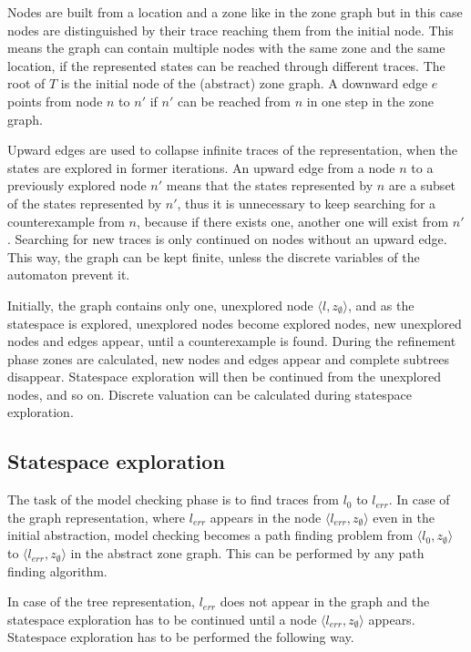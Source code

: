 Nodes are built from a location and a zone like in the zone graph but in this case nodes are distinguished by their trace reaching them from the initial node. This means the graph can contain multiple nodes with the same zone and the same location, if the represented states can be reached through different traces. The root of $T$ is the initial node of the (abstract) zone graph. A downward edge $e$ points from node $n$ to $n'$ if $n'$ can be reached from $n$ in one step in the zone graph. %

Upward edges are used to collapse infinite traces of the representation, when the states are explored in former iterations. An upward edge from a node $n$ to a previously explored node $n'$ means that the states
represented by $n$ are a subset of the states represented by $n'$, thus it is unnecessary to keep searching for a
counterexample from $n$, because if there exists one, another one will exist
from $n'$. Searching for new traces is only continued on nodes without an upward edge. This way, the graph can be kept finite, unless the discrete variables of the automaton prevent it.

Initially, the graph contains only one, unexplored node $\langle l, z_{\emptyset} \rangle$, and as the statespace is explored, unexplored nodes become explored nodes, new unexplored nodes and edges appear, until a counterexample is found. During the refinement phase zones are calculated, new nodes and edges appear and complete subtrees disappear. Statespace exploration will then be continued from the unexplored nodes, and so on. Discrete valuation can be calculated during statespace exploration.


\subsection{Statespace exploration}

The task of the model checking phase is to find traces from $l_0$ to $l_{err}$. In case of the graph representation, where $l_{err}$ appears in the node  $\langle l_{err}, z_{\emptyset} \rangle$ even in the initial abstraction, model checking becomes a path finding problem from $\langle l_{0}, z_{\emptyset} \rangle$ to $\langle l_{err}, z_{\emptyset} \rangle$ in the abstract zone graph. This can be performed by any path finding algorithm.


In case of the tree representation, $l_{err}$ does not appear in the graph and the statespace exploration has to be continued until a node $\langle l_{err}, z_{\emptyset} \rangle$ appears. Statespace exploration has to be performed the following way.

